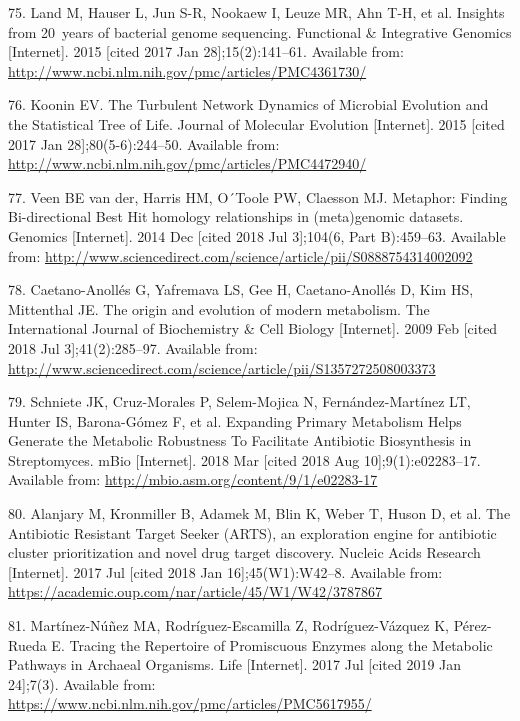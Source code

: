 \documentclass[12pt,twoside]{reedthesis}
\begin{document}
{  \hypertarget{ref-land_insights_2015}{}
  75. Land M, Hauser L, Jun S-R, Nookaew I, Leuze MR, Ahn T-H, et al.
  Insights from 20~years of bacterial genome sequencing. Functional \&
  Integrative Genomics {[}Internet{]}. 2015 {[}cited 2017 Jan
  28{]};15(2):141--61. Available from:
  \url{http://www.ncbi.nlm.nih.gov/pmc/articles/PMC4361730/}
  
  \hypertarget{ref-koonin_turbulent_2015}{}
  76. Koonin EV. The Turbulent Network Dynamics of Microbial Evolution and
  the Statistical Tree of Life. Journal of Molecular Evolution
  {[}Internet{]}. 2015 {[}cited 2017 Jan 28{]};80(5-6):244--50. Available
  from: \url{http://www.ncbi.nlm.nih.gov/pmc/articles/PMC4472940/}
  
  \hypertarget{ref-van_der_veen_metaphor_2014}{}
  77. Veen BE van der, Harris HM, O´Toole PW, Claesson MJ. Metaphor:
  Finding Bi-directional Best Hit homology relationships in (meta)genomic
  datasets. Genomics {[}Internet{]}. 2014 Dec {[}cited 2018 Jul
  3{]};104(6, Part B):459--63. Available from:
  \url{http://www.sciencedirect.com/science/article/pii/S0888754314002092}
  
  \hypertarget{ref-caetano-anolles_origin_metabolism_2009}{}
  78. Caetano-Anollés G, Yafremava LS, Gee H, Caetano-Anollés D, Kim HS,
  Mittenthal JE. The origin and evolution of modern metabolism. The
  International Journal of Biochemistry \& Cell Biology {[}Internet{]}.
  2009 Feb {[}cited 2018 Jul 3{]};41(2):285--97. Available from:
  \url{http://www.sciencedirect.com/science/article/pii/S1357272508003373}
  
  \hypertarget{ref-schniete_expanding_2018}{}
  79. Schniete JK, Cruz-Morales P, Selem-Mojica N, Fernández-Martínez LT,
  Hunter IS, Barona-Gómez F, et al. Expanding Primary Metabolism Helps
  Generate the Metabolic Robustness To Facilitate Antibiotic Biosynthesis
  in Streptomyces. mBio {[}Internet{]}. 2018 Mar {[}cited 2018 Aug
  10{]};9(1):e02283--17. Available from:
  \url{http://mbio.asm.org/content/9/1/e02283-17}
  
  \hypertarget{ref-alanjary_antibiotic_2017}{}
  80. Alanjary M, Kronmiller B, Adamek M, Blin K, Weber T, Huson D, et al.
  The Antibiotic Resistant Target Seeker (ARTS), an exploration engine for
  antibiotic cluster prioritization and novel drug target discovery.
  Nucleic Acids Research {[}Internet{]}. 2017 Jul {[}cited 2018 Jan
  16{]};45(W1):W42--8. Available from:
  \url{https://academic.oup.com/nar/article/45/W1/W42/3787867}
  
  \hypertarget{ref-martinez-nunez_promiscuity_Archaea_2017}{}
  81. Martínez-Núñez MA, Rodríguez-Escamilla Z, Rodríguez-Vázquez K,
  Pérez-Rueda E. Tracing the Repertoire of Promiscuous Enzymes along the
  Metabolic Pathways in Archaeal Organisms. Life {[}Internet{]}. 2017 Jul
  {[}cited 2019 Jan 24{]};7(3). Available from:
  \url{https://www.ncbi.nlm.nih.gov/pmc/articles/PMC5617955/}
  
}
\end{document}
